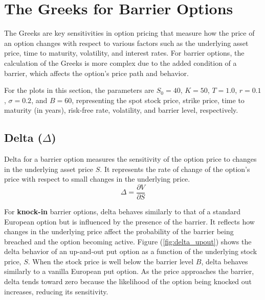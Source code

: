 \chapter{The Greeks for Barrier Options}
\label{sec:greeks}

The Greeks are key sensitivities in option pricing that measure how the price of an option changes with respect to various factors such as the underlying asset price, time to maturity, volatility, and interest rates. For barrier options, the calculation of the Greeks is more complex due to the added condition of a barrier, which affects the option's price path and behavior.

For the plots in this section, the parameters are \( S_0 = 40 \), \( K = 50 \), \( T = 1.0 \), \( r = 0.1 \), \( \sigma = 0.2 \), and \( B = 60 \), representing the spot stock price, strike price, time to maturity (in years), risk-free rate, volatility, and barrier level, respectively.




\section{Delta (\(\Delta\))}

Delta for a barrier option measures the sensitivity of the option price to changes in the underlying asset price $S$. It represents the rate of change of the option's price with respect to small changes in the underlying price.
\[
\Delta = \frac{\partial V}{\partial S}
\]

For \textbf{knock-in} barrier options, delta behaves similarly to that of a standard European option but is influenced by the presence of the barrier. It reflects how changes in the underlying price affect the probability of the barrier being breached and the option becoming active. Figure (\ref{fig:delta_upout}) shows the delta behavior of an up-and-out put option as a function of the underlying stock price, $S$. When the stock price is well below the barrier level $B$, delta behaves similarly to a vanilla European put option. As the price approaches the barrier, delta tends toward zero because the likelihood of the option being knocked out increases, reducing its sensitivity.

